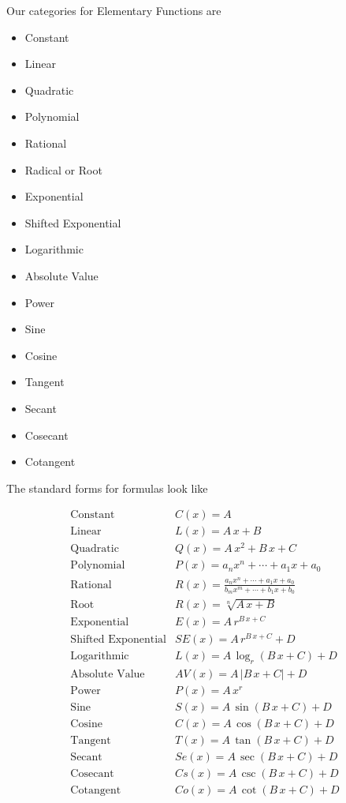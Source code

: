 \documentclass{ximera}
\begin{document}
Our categories for Elementary Functions are

\begin{itemize}
    \item Constant
    \item Linear
    \item Quadratic
    \item Polynomial
    \item Rational
    \item Radical or Root
    \item Exponential
    \item Shifted Exponential 
    \item Logarithmic
    \item Absolute Value
    \item Power
    \item Sine
    \item Cosine
    \item Tangent
    \item Secant
    \item Cosecant
    \item Cotangent
\end{itemize} 





The standard forms for formulas look like



\[
\begin{array}{ll}
\text{Constant}  & C(x) = A  \\
\text{Linear}  & L(x) = A \, x + B  \\
\text{Quadratic}  & Q(x) = A \, x^2 + B \, x + C  \\
\text{Polynomial}  & P(x) = a_n x^n + \cdots + a_1 x + a_0  \\
\text{Rational}  & R(x) = \frac{a_n x^n + \cdots + a_1 x + a_0}{b_m x^m + \cdots + b_1 x + b_0}  \\
\text{Root}  & R(x) = \sqrt[n]{A \, x + B}  \\
\text{Exponential}  & E(x) = A \, r^{B \, x + C}  \\
\text{Shifted Exponential}  & SE(x) = A \, r^{B \, x + C} + D  \\
\text{Logarithmic}  & L(x) = A \, \log_r(B \, x + C) + D  \\
\text{Absolute Value}  & AV(x) = A \, |B \, x + C| + D \\
\text{Power}  & P(x) = A \, x^r  \\
\text{Sine}  & S(x) = A \, \sin(B \, x + C) + D  \\
\text{Cosine}  & C(x) = A \, \cos(B \, x + C) + D  \\
\text{Tangent}  & T(x) = A \, \tan(B \, x + C) + D  \\
\text{Secant}  & Se(x) = A \, \sec(B \, x + C) + D  \\
\text{Cosecant}  & Cs(x) = A \, \csc(B \, x + C) + D  \\
\text{Cotangent}  & Co(x) = A \, \cot(B \, x + C) + D  
\end{array}
\]
\end{document}

